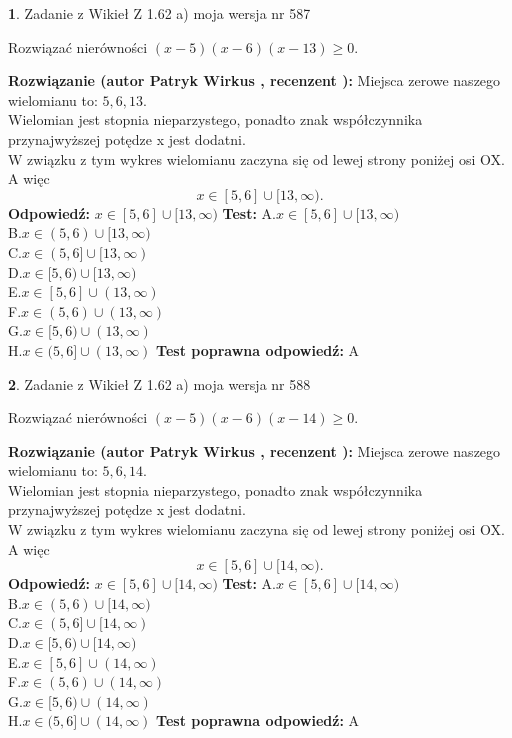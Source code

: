 \documentclass[12pt, a4paper]{article}
\theoremstyle{definition} %
\newtheorem{zad}{}
\newcommand{\zadStart}[1]{\begin{zad}#1\newline}
\newcommand{\zadStop}{\end{zad}}
\newcommand{\rozwStart}[2]{\noindent \textbf{Rozwiązanie (autor #1 , recenzent #2): }\newline}
\newcommand{\rozwStop}{\newline}
\newcommand{\odpStart}{\noindent \textbf{Odpowiedź:}\newline}
\newcommand{\odpStop}{\newline}
\newcommand{\testStart}{\noindent \textbf{Test:}\newline}
\newcommand{\testStop}{\newline}
\newcommand{\kluczStart}{\noindent \textbf{Test poprawna odpowiedź:}\newline}
\newcommand{\kluczStop}{\newline}
\begin{document}
\zadStart{Zadanie z Wikieł Z 1.62 a) moja wersja nr 587}

Rozwiązać nierówności $(x-5)(x-6)(x-13)\ge0$.
\zadStop
\rozwStart{Patryk Wirkus}{}
Miejsca zerowe naszego wielomianu to: $5, 6, 13$.\\
Wielomian jest stopnia nieparzystego, ponadto znak współczynnika przy\linebreak najwyższej potędze x jest dodatni.\\ W związku z tym wykres wielomianu zaczyna się od lewej strony poniżej osi OX. A więc $$x \in [5,6] \cup [13,\infty).$$
\rozwStop
\odpStart
$x \in [5,6] \cup [13,\infty)$
\odpStop
\testStart
A.$x \in [5,6] \cup [13,\infty)$\\
B.$x \in (5,6) \cup [13,\infty)$\\
C.$x \in (5,6] \cup [13,\infty)$\\
D.$x \in [5,6) \cup [13,\infty)$\\
E.$x \in [5,6] \cup (13,\infty)$\\
F.$x \in (5,6) \cup (13,\infty)$\\
G.$x \in [5,6) \cup (13,\infty)$\\
H.$x \in (5,6] \cup (13,\infty)$
\testStop
\kluczStart
A
\kluczStop



\zadStart{Zadanie z Wikieł Z 1.62 a) moja wersja nr 588}

Rozwiązać nierówności $(x-5)(x-6)(x-14)\ge0$.
\zadStop
\rozwStart{Patryk Wirkus}{}
Miejsca zerowe naszego wielomianu to: $5, 6, 14$.\\
Wielomian jest stopnia nieparzystego, ponadto znak współczynnika przy\linebreak najwyższej potędze x jest dodatni.\\ W związku z tym wykres wielomianu zaczyna się od lewej strony poniżej osi OX. A więc $$x \in [5,6] \cup [14,\infty).$$
\rozwStop
\odpStart
$x \in [5,6] \cup [14,\infty)$
\odpStop
\testStart
A.$x \in [5,6] \cup [14,\infty)$\\
B.$x \in (5,6) \cup [14,\infty)$\\
C.$x \in (5,6] \cup [14,\infty)$\\
D.$x \in [5,6) \cup [14,\infty)$\\
E.$x \in [5,6] \cup (14,\infty)$\\
F.$x \in (5,6) \cup (14,\infty)$\\
G.$x \in [5,6) \cup (14,\infty)$\\
H.$x \in (5,6] \cup (14,\infty)$
\testStop
\kluczStart
A
\kluczStop
\end{document}
